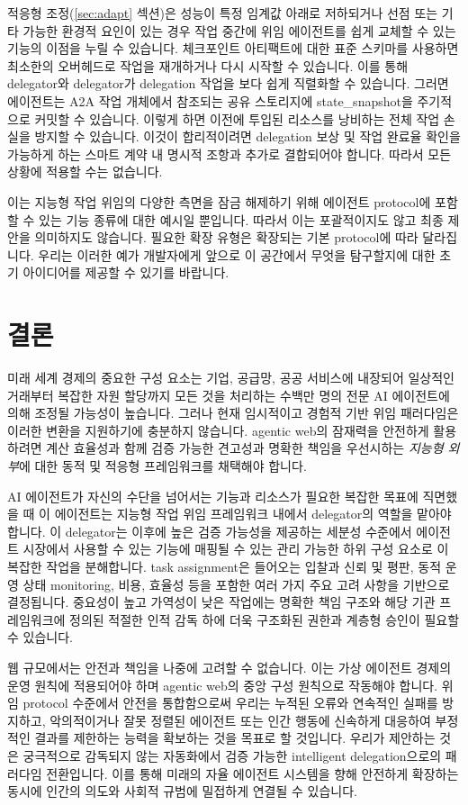\documentclass[11pt, a4paper, twocolumn, copyright, goog]{google}
\begin{document}
적응형 조정(\ref{sec:adapt} 섹션)은 성능이 특정 임계값 아래로 저하되거나 선점 또는 기타 가능한 환경적 요인이 있는 경우 작업 중간에 위임 에이전트를 쉽게 교체할 수 있는 기능의 이점을 누릴 수 있습니다. 체크포인트 아티팩트에 대한 표준 스키마를 사용하면 최소한의 오버헤드로 작업을 재개하거나 다시 시작할 수 있습니다. 이를 통해 delegator와 delegator가 delegation 작업을 보다 쉽게 직렬화할 수 있습니다. 그러면 에이전트는 A2A 작업 개체에서 참조되는 공유 스토리지에 state\_snapshot을 주기적으로 커밋할 수 있습니다. 이렇게 하면 이전에 투입된 리소스를 낭비하는 전체 작업 손실을 방지할 수 있습니다. 이것이 합리적이려면 delegation 보상 및 작업 완료율 확인을 가능하게 하는 스마트 계약 내 명시적 조항과 추가로 결합되어야 합니다. 따라서 모든 상황에 적용할 수는 없습니다.

이는 지능형 작업 위임의 다양한 측면을 잠금 해제하기 위해 에이전트 protocol에 포함할 수 있는 기능 종류에 대한 예시일 뿐입니다. 따라서 이는 포괄적이지도 않고 최종 제안을 의미하지도 않습니다. 필요한 확장 유형은 확장되는 기본 protocol에 따라 달라집니다. 우리는 이러한 예가 개발자에게 앞으로 이 공간에서 무엇을 탐구할지에 대한 초기 아이디어를 제공할 수 있기를 바랍니다.

\section{결론}

미래 세계 경제의 중요한 구성 요소는 기업, 공급망, 공공 서비스에 내장되어 일상적인 거래부터 복잡한 자원 할당까지 모든 것을 처리하는 수백만 명의 전문 AI 에이전트에 의해 조정될 가능성이 높습니다. 그러나 현재 임시적이고 경험적 기반 위임 패러다임은 이러한 변환을 지원하기에 충분하지 않습니다. agentic web의 잠재력을 안전하게 활용하려면 계산 효율성과 함께 검증 가능한 견고성과 명확한 책임을 우선시하는 \emph{지능형 외부}에 대한 동적 및 적응형 프레임워크를 채택해야 합니다.

AI 에이전트가 자신의 수단을 넘어서는 기능과 리소스가 필요한 복잡한 목표에 직면했을 때 이 에이전트는 지능형 작업 위임 프레임워크 내에서 delegator의 역할을 맡아야 합니다. 이 delegator는 이후에 높은 검증 가능성을 제공하는 세분성 수준에서 에이전트 시장에서 사용할 수 있는 기능에 매핑될 수 있는 관리 가능한 하위 구성 요소로 이 복잡한 작업을 분해합니다. task assignment은 들어오는 입찰과 신뢰 및 평판, 동적 운영 상태 monitoring, 비용, 효율성 등을 포함한 여러 가지 주요 고려 사항을 기반으로 결정됩니다. 중요성이 높고 가역성이 낮은 작업에는 명확한 책임 구조와 해당 기관 프레임워크에 정의된 적절한 인적 감독 하에 더욱 구조화된 권한과 계층형 승인이 필요할 수 있습니다.

웹 규모에서는 안전과 책임을 나중에 고려할 수 없습니다. 이는 가상 에이전트 경제의 운영 원칙에 적용되어야 하며 agentic web의 중앙 구성 원칙으로 작동해야 합니다. 위임 protocol 수준에서 안전을 통합함으로써 우리는 누적된 오류와 연속적인 실패를 방지하고, 악의적이거나 잘못 정렬된 에이전트 또는 인간 행동에 신속하게 대응하여 부정적인 결과를 제한하는 능력을 확보하는 것을 목표로 할 것입니다. 우리가 제안하는 것은 궁극적으로 감독되지 않는 자동화에서 검증 가능한 intelligent delegation으로의 패러다임 전환입니다. 이를 통해 미래의 자율 에이전트 시스템을 향해 안전하게 확장하는 동시에 인간의 의도와 사회적 규범에 밀접하게 연결될 수 있습니다.


\end{document}

